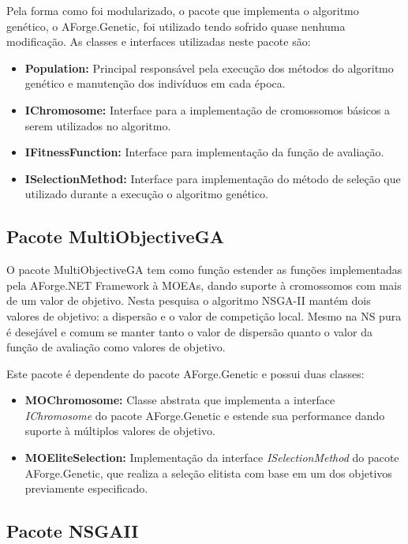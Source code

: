 Pela forma como foi modularizado, o pacote que implementa o algoritmo genético, o AForge.Genetic, foi utilizado tendo sofrido quase nenhuma modificação. As classes e interfaces utilizadas neste pacote são:
\vspace{-5mm}
\begin{itemize}[leftmargin=1.25\parindent]
    \item \textbf{Population:} Principal responsável pela execução dos métodos do algoritmo genético e manutenção dos indivíduos em cada época.
    \item \textbf{IChromosome:} Interface para a implementação de cromossomos básicos a serem utilizados no algoritmo.
    \item \textbf{IFitnessFunction:} Interface para implementação da função de avaliação.
    \item \textbf{ISelectionMethod:} Interface para implementação do método de seleção que utilizado durante a execução o algoritmo genético.
\end{itemize}

\subsection{Pacote MultiObjectiveGA}

O pacote MultiObjectiveGA tem como função estender as funções implementadas pela AForge.NET Framework à MOEAs, dando suporte à cromossomos com mais de um valor de objetivo. Nesta pesquisa o algoritmo NSGA-II mantém dois valores de objetivo: a dispersão e o valor de competição local. Mesmo na NS pura é desejável e comum se manter tanto o valor de dispersão quanto o valor da função de avaliação como valores de objetivo.

Este pacote é dependente do pacote AForge.Genetic e possui duas classes:
\vspace{-5mm}
\begin{itemize}[leftmargin=1.25\parindent]
    \item \textbf{MOChromosome:} Classe abstrata que implementa a interface \emph{IChromosome} do pacote AForge.Genetic e estende sua performance dando suporte à múltiplos valores de objetivo.
    \item \textbf{MOEliteSelection:} Implementação da interface \emph{ISelectionMethod} do pacote AForge.Genetic, que realiza a seleção elitista com base em um dos objetivos previamente especificado.
\end{itemize}

\subsection{Pacote NSGAII}

